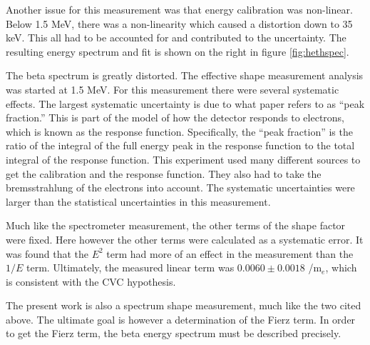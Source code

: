 \documentclass[../MaxHughesThesis.tex]{subfiles}
\begin{document}
Another issue for this measurement was that energy calibration was non-linear.
Below 1.5 MeV, there was a non-linearity which caused a distortion down to 35 keV. 
This all had to be accounted for and contributed to the uncertainty.
The resulting energy spectrum and fit is shown on the right in figure \ref{fig:hethspec}.


The beta spectrum is greatly distorted.
The effective shape measurement analysis was started at 1.5 MeV.
For this measurement there were several systematic effects.
The largest systematic uncertainty is due to what  paper refers  to as ``peak fraction.''
This is part of the model of how the detector responds to electrons, which is known as the response function.
Specifically, the ``peak fraction'' is the ratio of the integral of the full energy peak in the response function to the total integral of the response function. 
This experiment used many different sources to get the calibration and the response function.
They also had to take the bremsstrahlung of the electrons into account.
The systematic uncertainties were larger than the statistical uncertainties in this measurement. 

Much like the spectrometer measurement, the other terms of the shape factor were fixed.
Here however the other terms were calculated as a systematic error.
It was found that the $E^{2}$ term had more of an effect in the measurement than the $1/E$ term.
Ultimately, the measured linear term was $0.0060 \pm 0.0018$ /m$_{e}$, which is consistent with the CVC hypothesis. 

The present work is also a spectrum shape measurement, much like the two cited above.
The ultimate goal is however a  determination of the Fierz term. 
In order to get the Fierz term, the beta energy spectrum must be described precisely.
\end{document}
